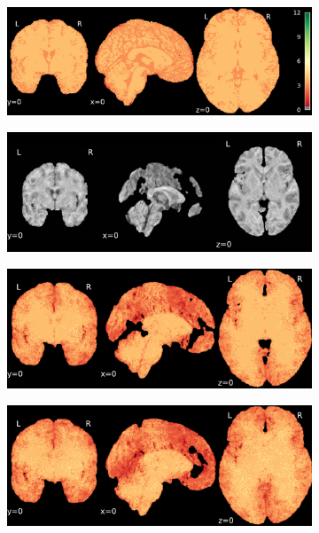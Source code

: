 \documentclass{article}
\begin{document}
\begin{landscape}
\begin{figure}
\begin{subfigure}[t]{0.2\paperheight}
        \end{subfigure}
        \begin{subfigure}[t]{0.2\paperheight}
            \centering
            \includegraphics[width=\textwidth]{figures/sig/ds000256_sub-CTS201_rr.rs_sig.pdf}
        \end{subfigure}
        \begin{subfigure}[t]{0.2\paperheight}
            \centering
            \includegraphics[width=\textwidth]{figures/ieee_T1/ds000256_sub-CTS210_ieee_mean.pdf}
        \end{subfigure}
        \begin{subfigure}[t]{0.2\paperheight}
            \centering
            \includegraphics[width=\textwidth]{figures/sig/ds000256_sub-CTS210_rr_sig.pdf}
        \end{subfigure}
        \begin{subfigure}[t]{0.2\paperheight}
            \centering
            \includegraphics[width=\textwidth]{figures/sig/ds000256_sub-CTS210_rs_sig.pdf}

\end{subfigure}
\end{figure}
\end{landscape}
\end{document}
